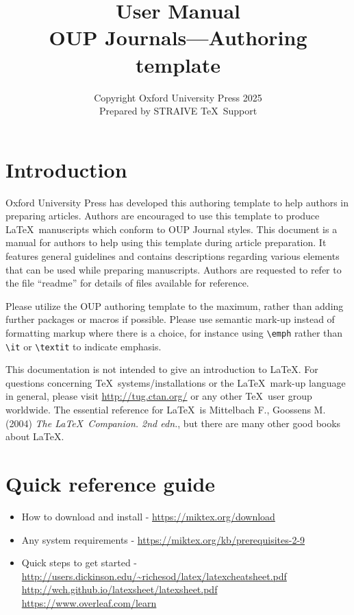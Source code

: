 \documentclass{article}
\begin{document}
\title{\bfseries User Manual\\
OUP Journals---Authoring template}

\author{Copyright Oxford University Press 2025\\
\small Prepared by STRAIVE \TeX\ Support}


\maketitle

\tableofcontents

\section{Introduction }
Oxford University Press has developed this authoring template to
help authors in preparing articles. Authors are encouraged to use
this template to produce \LaTeX\ manuscripts which conform to OUP
Journal styles. This document is a manual for authors to help using
this template during article preparation. It features general
guidelines and contains descriptions regarding various elements that
can be used while preparing manuscripts. Authors are requested to
refer to the file ``readme'' for details of files available for
reference.

Please utilize the OUP authoring template to the maximum, rather
than adding further packages or macros if possible. Please use
semantic mark-up instead of formatting markup where there is a
choice, for instance using \verb+\emph+ rather than \verb+\it+ or
\verb+\textit+ to indicate emphasis.

This documentation is not intended to give an introduction to \LaTeX. For questions concerning \TeX\ systems/installations or the \LaTeX\ mark-up language in general, please visit \url{http://tug.ctan.org/} or any other \TeX\ user group worldwide. The essential reference for \LaTeX\ is Mittelbach F., Goossens M. (2004) \textit{The \LaTeX\ Companion. 2nd edn.}, but there are many other good books about \LaTeX.

\section{Quick reference guide}
\begin{itemize}
\item How to download and install - \url{https://miktex.org/download}
\item Any system requirements - \url{https://miktex.org/kb/prerequisites-2-9}
\item Quick steps to get started - \url{http://users.dickinson.edu/~richesod/latex/latexcheatsheet.pdf}\newline
\url{http://wch.github.io/latexsheet/latexsheet.pdf}\newline
\url{https://www.overleaf.com/learn}
\end{itemize}
\end{document}
